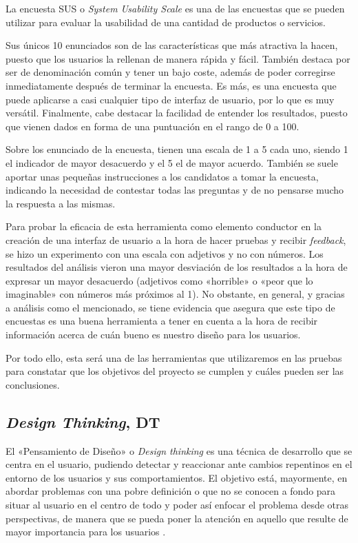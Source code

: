 La encuesta SUS o \textit{System Usability Scale} \cite{sus} es una de las encuestas que se pueden utilizar para evaluar la usabilidad de una cantidad de productos o servicios.

Sus únicos 10 enunciados son de las características que más atractiva la hacen, puesto que los usuarios la rellenan de manera rápida y fácil. También destaca por ser de denominación común y tener un bajo coste, además de poder corregirse inmediatamente después de terminar la encuesta. Es más, es una encuesta que puede aplicarse a casi cualquier tipo de interfaz de usuario, por lo que es muy versátil. Finalmente, cabe destacar la facilidad de entender los resultados, puesto que vienen dados en forma de una puntuación en el rango de 0 a 100.

Sobre los enunciado de la encuesta, tienen una escala de 1 a 5 cada uno, siendo 1 el indicador de mayor desacuerdo y el 5 el de mayor acuerdo. También se suele aportar unas pequeñas instrucciones a los candidatos a tomar la encuesta, indicando la necesidad de contestar todas las preguntas y de no pensarse mucho la respuesta a las mismas.

Para probar la eficacia de esta herramienta como elemento conductor en la creación de una interfaz de usuario a la hora de hacer pruebas y recibir \textit{feedback}, se hizo un experimento con una escala con adjetivos y no con números. Los resultados del análisis \cite{sus} vieron una mayor desviación de los resultados a la hora de expresar un mayor desacuerdo (adjetivos como «horrible» o «peor que lo imaginable» con números más próximos al 1). No obstante, en general, y gracias a análisis como el mencionado, se tiene evidencia que asegura que este tipo de encuestas es una buena herramienta a tener en cuenta a la hora de recibir información acerca de cuán bueno es nuestro diseño para los usuarios.

Por todo ello, esta será una de las herramientas que utilizaremos en las pruebas para constatar que los objetivos del proyecto se cumplen y cuáles pueden ser las conclusiones.

\subsection{\textit{Design Thinking}, DT}

El «Pensamiento de Diseño» o \textit{Design thinking} es una técnica de desarrollo que se centra en el usuario, pudiendo detectar y reaccionar ante cambios repentinos en el entorno de los usuarios y sus comportamientos. El objetivo está, mayormente, en abordar problemas con una pobre definición o que no se conocen a fondo para situar al usuario en el centro de todo y poder así enfocar el problema desde otras perspectivas, de manera que se pueda poner la atención en aquello que resulte de mayor importancia para los usuarios \cite{dt}.

